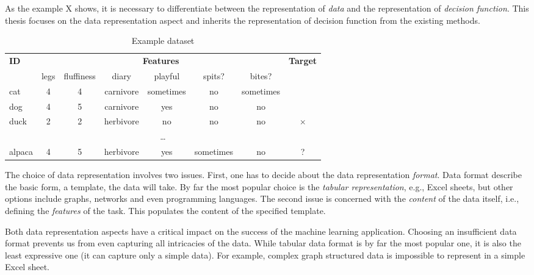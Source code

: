 As the example X shows, it is necessary to differentiate between the representation of \textit{data} and the representation of  \textit{decision function}.
This thesis focuses on the data representation aspect and inherits the representation of decision function from the existing methods.

\begin{table}
	\centering
	\caption{Example dataset}
	\begin{tabular}{@{}lccccccc@{}}
		\toprule
		\textbf{ID} &\multicolumn{6}{c}{\textbf{Features}} 									& \textbf{Target} \\
		\cmidrule(lr){2-7} 
					& legs	& fluffiness		& diary 		& playful	& spits? 	& bites? 	&	\\
		\midrule
		cat			& 4		& 4				& carnivore	& sometimes & no		 	& sometimes	&  \checkmark \\
		dog			& 4		& 5				& carnivore	& yes		& no		& no		& \checkmark \\
		duck		& 2		& 2				& herbivore	& no			& no		& no		& $\times$ \\
		\multicolumn{8}{c}{\ldots} \\
		alpaca		& 4		& 5				& herbivore & yes		& sometimes	& no		& ? \\
		\bottomrule
	\end{tabular}
	\label{tab:pets}
\end{table}



The choice of data representation involves two issues.
First, one has to decide about the data representation \textit{format}.
Data format describe the basic form, a template, the data will take.
By far the most popular choice is the \textit{tabular representation}, e.g., Excel sheets, but other options include graphs, networks and even programming languages.
The second issue is concerned with the \textit{content} of the data itself, i.e., defining the \textit{features} of the task.
This populates the content of the specified template.



Both data representation aspects have a critical impact on the success of the machine learning application.
Choosing an insufficient data format prevents us from even capturing all intricacies of the data.
While tabular data format is by far the most popular one, it is also the least expressive one (it can capture only a simple data).
For example, complex graph structured data is impossible to represent in a simple Excel sheet.



